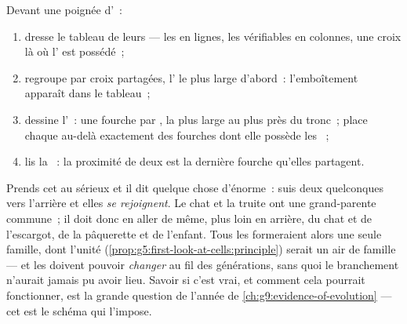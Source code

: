 \begin{method}\label{met:g6:classification-kinship:build}
Devant une poignée d'~:
\begin{enumerate}
  \item dresse le tableau de leurs  --- les  en
        lignes, les  vérifiables en colonnes, une croix là
        où l' est possédé~;
  \item regroupe par croix partagées, l' le plus large
        d'abord~: l'emboîtement apparaît dans le tableau~;
  \item dessine l'~: une fourche par , la plus large
        au plus près du tronc~; place chaque  au-delà
        exactement des fourches dont elle possède les ~;
  \item lis la ~: la proximité de deux  est la
        dernière fourche qu'elles partagent.
\end{enumerate}
\end{method}

\begin{remark}\label{rem:g6:classification-kinship:implies}
Prends cet  au sérieux et il dit quelque chose d'énorme~: suis
deux  quelconques vers l'arrière et elles \emph{se
rejoignent}. Le chat et la truite ont une  grand-parente
commune~; il doit donc en aller de même, plus loin en arrière, du
chat et de l'escargot, de la pâquerette et de l'enfant. Tous les
 formeraient alors une seule famille, dont l'unité
(\cref{prop:g5:first-look-at-cells:principle}) serait un air de
famille --- et les  doivent pouvoir \emph{changer} au fil des
générations, sans quoi le branchement n'aurait jamais pu avoir lieu.
Savoir si c'est vrai, et comment cela pourrait fonctionner, est la
grande question de l'année de \cref{ch:g9:evidence-of-evolution} ---
cet  est le schéma qui l'impose.
\end{remark}

